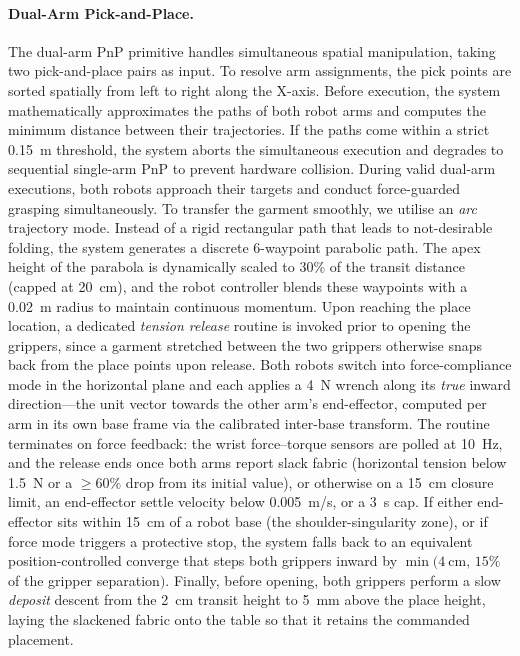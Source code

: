 \documentclass[journal]{IEEEtran}
\begin{document}
\paragraph{Dual-Arm Pick-and-Place.} The dual-arm PnP primitive handles simultaneous spatial manipulation, taking two pick-and-place pairs as input. To resolve arm assignments, the pick points are sorted spatially from left to right along the X-axis. Before execution, the system mathematically approximates the paths of both robot arms and computes the minimum distance between their trajectories. If the paths come within a strict 0.15~m threshold, the system aborts the simultaneous execution and degrades to sequential single-arm PnP to prevent hardware collision. During valid dual-arm executions, both robots approach their targets and conduct force-guarded grasping simultaneously. To transfer the garment smoothly, we utilise an \textit{arc} trajectory mode. Instead of a rigid rectangular path that leads to not-desirable folding, the system generates a discrete 6-waypoint parabolic path. The apex height of the parabola is dynamically scaled to 30\% of the transit distance (capped at 20~cm), and the robot controller blends these waypoints with a 0.02~m radius to maintain continuous momentum. Upon reaching the place location, a dedicated \textit{tension release} routine is invoked prior to opening the grippers, since a garment stretched between the two grippers otherwise snaps back from the place points upon release. Both robots switch into force-compliance mode in the horizontal plane and each applies a 4~N wrench along its \emph{true} inward direction---the unit vector towards the other arm's end-effector, computed per arm in its own base frame via the calibrated inter-base transform. The routine terminates on force feedback: the wrist force--torque sensors are polled at 10~Hz, and the release ends once both arms report slack fabric (horizontal tension below 1.5~N or a ${\geq}60\%$ drop from its initial value), or otherwise on a 15~cm closure limit, an end-effector settle velocity below 0.005~m/s, or a 3~s cap. If either end-effector sits within 15~cm of a robot base (the shoulder-singularity zone), or if force mode triggers a protective stop, the system falls back to an equivalent position-controlled converge that steps both grippers inward by $\min(4~\text{cm},\, 15\%$ of the gripper separation$)$. Finally, before opening, both grippers perform a slow \textit{deposit} descent from the 2~cm transit height to 5~mm above the place height, laying the slackened fabric onto the table so that it retains the commanded placement.
\end{document}
